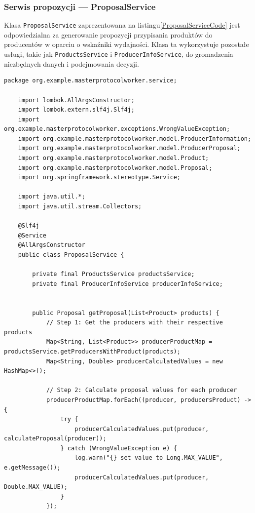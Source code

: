 \subsubsection{Serwis propozycji --- ProposalService}

Klasa \verb|ProposalService| zaprezentowana na listingu\ref{ProposalServiceCode} jest odpowiedzialna za generowanie propozycji przypisania produktów do producentów w oparciu o wskaźniki wydajności. Klasa ta wykorzystuje pozostałe usługi, takie jak \verb|ProductsService| i \verb|ProducerInfoService|, do gromadzenia niezbędnych danych i podejmowania decyzji.

\begin{lstlisting}[caption=Kod klasy ProposalService, label=ProposalServiceCode]
    package org.example.masterprotocolworker.service;

    import lombok.AllArgsConstructor;
    import lombok.extern.slf4j.Slf4j;
    import org.example.masterprotocolworker.exceptions.WrongValueException;
    import org.example.masterprotocolworker.model.ProducerInformation;
    import org.example.masterprotocolworker.model.ProducerProposal;
    import org.example.masterprotocolworker.model.Product;
    import org.example.masterprotocolworker.model.Proposal;
    import org.springframework.stereotype.Service;
    
    import java.util.*;
    import java.util.stream.Collectors;
    
    @Slf4j
    @Service
    @AllArgsConstructor
    public class ProposalService {
    
        private final ProductsService productsService;
        private final ProducerInfoService producerInfoService;
    
    
        public Proposal getProposal(List<Product> products) {
            // Step 1: Get the producers with their respective products
            Map<String, List<Product>> producerProductMap = productsService.getProducersWithProduct(products);
            Map<String, Double> producerCalculatedValues = new HashMap<>();
    
            // Step 2: Calculate proposal values for each producer
            producerProductMap.forEach((producer, producersProduct) -> {
                try {
                    producerCalculatedValues.put(producer, calculateProposal(producer));
                } catch (WrongValueException e) {
                    log.warn("{} set value to Long.MAX_VALUE", e.getMessage());
                    producerCalculatedValues.put(producer, Double.MAX_VALUE);
                }
            });
    

\end{lstlisting}
